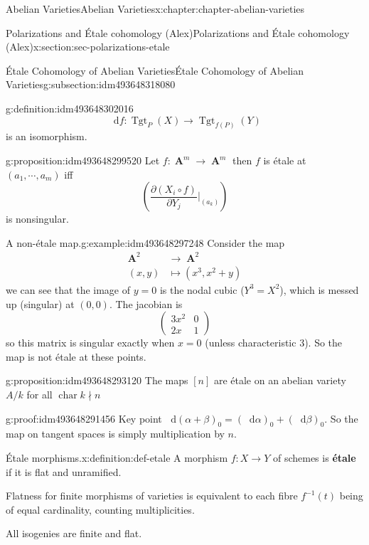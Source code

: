 \documentclass[oneside,10pt,]{book}
\newcommand{\terminology}[1]{\textbf{#1}}
\numberwithin{equation}{section}
\newcommand{\diff}{\mathop{}\!\mathrm{d}}
\newcommand{\lb}{[}
\newcommand{\rb}{]}
\DeclareMathOperator{\Tgt}{Tgt}
\DeclareMathOperator{\characteristic}{char}
\DeclareMathOperator{\aff}{\mathbf{A}}
\newcommand{\amp}{&}
\begin{document}
\begin{chapterptx}{Abelian Varieties}{}{Abelian Varieties}{}{}{x:chapter:chapter-abelian-varieties}
\begin{sectionptx}{Polarizations and Étale cohomology (Alex)}{}{Polarizations and Étale cohomology (Alex)}{}{}{x:section:sec-polarizations-etale}
\begin{subsectionptx}{Étale Cohomology of Abelian Varieties}{}{Étale Cohomology of Abelian Varieties}{}{}{g:subsection:idm493648318080}
\begin{definition}{}{g:definition:idm493648302016}
\begin{equation*}
\diff f\colon\Tgt_{P}(X) \to \Tgt_{f(P)} (Y)
\end{equation*}
is an isomorphism.%
\end{definition}
\begin{proposition}{}{}{g:proposition:idm493648299520}%
Let \(f \colon \aff^m\to \aff^m\) then \(f\) is étale at \((a_1, \cdots, a_m)\) iff%
\begin{equation*}
\left(\frac{\partial(X_i \circ f)}{\partial Y_j}|_{(a_k)} \right)
\end{equation*}
is nonsingular.%
\end{proposition}
\begin{example}{A non-étale map.}{g:example:idm493648297248}%
Consider the map%
\begin{align*}
\aff^2 \amp\to \aff^2\\
(x,y) \amp\mapsto (x^3, x^2 + y)
\end{align*}
we can see that the image of \(y= 0\) is the nodal cubic (\(Y^3 = X^2\)), which is messed up (singular) at \((0,0)\). The jacobian is%
\begin{equation*}
\begin{pmatrix} 3x^2 \amp 0 \\ 2x \amp 1\end{pmatrix}
\end{equation*}
so this matrix is singular exactly when \(x= 0\) (unless characteristic 3). So the map is not étale at these points.%
\end{example}
\begin{proposition}{}{}{g:proposition:idm493648293120}%
The maps \(\lb n\rb\) are étale on an abelian variety \(A/k\) for all  \(\characteristic{k} \nmid n\)%
\end{proposition}
\begin{proofptx}{}{g:proof:idm493648291456}
Key point \(\diff (\alpha+ \beta)_0 = (\diff \alpha )_0 + (\diff \beta)_0\). So the map on tangent spaces is simply multiplication by \(n\).%
\end{proofptx}
\begin{definition}{Étale morphisms.}{x:definition:def-etale}%
A morphism \(f\colon X\to Y\) of schemes is \terminology{étale} if it is flat and unramified.%
\par
Flatness for finite morphisms of varieties is equivalent to each fibre \(f^{-1}(t)\) being of equal cardinality, counting multiplicities.%
\end{definition}
All isogenies are finite and flat.%

\end{subsectionptx}
\end{sectionptx}
\end{chapterptx}
\end{document}

